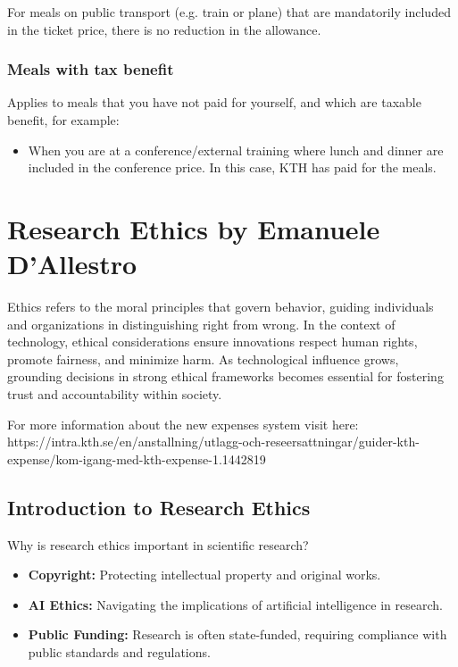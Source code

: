 \documentclass{article}
\begin{document}
For meals on public transport (e.g. train or plane) that are mandatorily included in the ticket price, there is no reduction in the allowance.

\subsubsection{Meals with tax benefit}

Applies to meals that you have not paid for yourself, and which are taxable benefit, for example:

\begin{itemize}
    \item When you are at a conference/external training where lunch and dinner are included in the conference price. In this case, KTH has paid for the meals.
\end{itemize}

\section{Research Ethics by Emanuele D'Allestro}
\label{sec:ethics}

Ethics refers to the moral principles that govern behavior, guiding individuals and organizations in distinguishing right from wrong.
In the context of technology, ethical considerations ensure innovations respect human rights, promote fairness, and minimize harm. As technological influence grows, grounding decisions in strong ethical frameworks becomes essential for fostering trust and accountability within society.



For more information about the new expenses system visit here: https://intra.kth.se/en/anstallning/utlagg-och-reseersattningar/guider-kth-expense/kom-igang-med-kth-expense-1.1442819


\subsection{Introduction to Research Ethics}

Why is research ethics important in scientific research?
\begin{itemize}
    \item \textbf{Copyright:} Protecting intellectual property and original works.
    \item \textbf{AI Ethics:} Navigating the implications of artificial intelligence in research.
    \item \textbf{Public Funding:} Research is often state-funded, requiring compliance with public standards and regulations.
\end{itemize}
\end{document}
